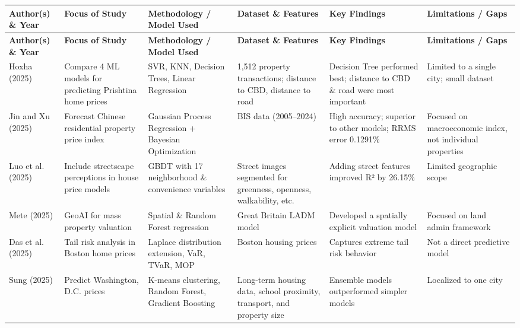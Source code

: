 \documentclass[12pt, a4paper, oneside]{book}
\begin{document}
\begin{table}[htbp]
\centering
\caption{Literature Review Summary}
\label{tab:literature_summary_detailed}
\footnotesize
\begin{longtable}{|p{1.5cm}|p{2.2cm}|p{2.0cm}|p{2.5cm}|p{2.8cm}|p{2.5cm}|}
\hline
\textbf{Author(s) \& Year} & \textbf{Focus of Study} & \textbf{Methodology / Model Used} & \textbf{Dataset \& Features} & \textbf{Key Findings} & \textbf{Limitations / Gaps} \\
\hline
\endfirsthead

\hline
\textbf{Author(s) \& Year} & \textbf{Focus of Study} & \textbf{Methodology / Model Used} & \textbf{Dataset \& Features} & \textbf{Key Findings} & \textbf{Limitations / Gaps} \\
\hline
\endhead

Hoxha (2025) & Compare 4 ML models for predicting Prishtina home prices & SVR, KNN, Decision Trees, Linear Regression & 1,512 property transactions; distance to CBD, distance to road & Decision Tree performed best; distance to CBD \& road were most important & Limited to a single city; small dataset \\
\hline
Jin and Xu (2025) & Forecast Chinese residential property price index & Gaussian Process Regression + Bayesian Optimization & BIS data (2005--2024) & High accuracy; superior to other models; RRMS error 0.1291\% & Focused on macroeconomic index, not individual properties \\
\hline
Luo et al. (2025) & Include streetscape perceptions in house price models & GBDT with 17 neighborhood \& convenience variables & Street images segmented for greenness, openness, walkability, etc. & Adding street features improved R² by 26.15\% & Limited geographic scope \\
\hline
Mete (2025) & GeoAI for mass property valuation & Spatial \& Random Forest regression & Great Britain LADM model & Developed a spatially explicit valuation model & Focused on land admin framework \\
\hline
Das et al. (2025) & Tail risk analysis in Boston home prices & Laplace distribution extension, VaR, TVaR, MOP & Boston housing prices & Captures extreme tail risk behavior & Not a direct predictive model \\
\hline
Sung (2025) & Predict Washington, D.C. prices & K-means clustering, Random Forest, Gradient Boosting & Long-term housing data, school proximity, transport, and property size & Ensemble models outperformed simpler models & Localized to one city \\

\end{longtable}
\end{table}
\end{document}
